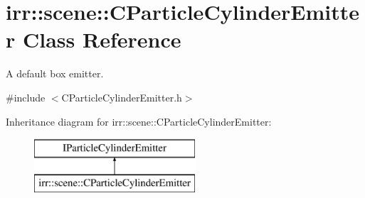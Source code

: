 \hypertarget{classirr_1_1scene_1_1_c_particle_cylinder_emitter}{\section{irr\-:\-:scene\-:\-:C\-Particle\-Cylinder\-Emitter Class Reference}
\label{classirr_1_1scene_1_1_c_particle_cylinder_emitter}
}


A default box emitter.  




{\ttfamily \#include $<$C\-Particle\-Cylinder\-Emitter.\-h$>$}

Inheritance diagram for irr\-:\-:scene\-:\-:C\-Particle\-Cylinder\-Emitter\-:\begin{figure}[H]
\begin{center}
\leavevmode
\includegraphics[height=2.000000cm]{classirr_1_1scene_1_1_c_particle_cylinder_emitter}
\end{center}
\end{figure}
